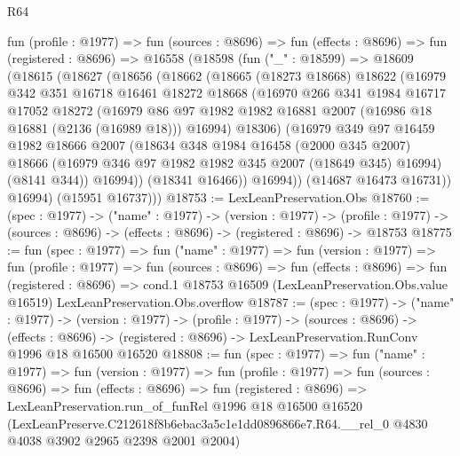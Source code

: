 \begin{lexlean}{R64}
\begin{coremodule}
  fun (profile : @1977) =>
  fun (sources : @8696) =>
  fun (effects : @8696) =>
  fun (registered : @8696) =>
  @16558
    (@18598
      (fun ("_" : @18599) =>
      @18609
        (@18615
          (@18627
            (@18656
              (@18662
                (@18665
                  (@18273 @18668)
                  @18622
                  (@16979
                    @342
                    @351
                    @16718
                    @16461
                    @18272
                    @18668
                    (@16970
                      @266
                      @341
                      @1984
                      @16717
                      @17052
                      @18272
                      (@16979
                        @86
                        @97
                        @1982
                        @1982
                        @16881
                        @2007
                        (@16986 @18 @16881 (@2136 (@16989 @18)))
                        @16994)
                      @18306)
                    (@16979
                      @349
                      @97
                      @16459
                      @1982
                      @18666
                      @2007
                      (@18634
                        @348
                        @1984
                        @16458
                        (@2000 @345 @2007)
                        @18666
                        (@16979 @346 @97 @1982 @1982 @345 @2007 (@18649 @345) @16994)
                        (@8141 @344))
                      @16994))
                  (@18341 @16466))
                @16994))
            (@14687 @16473 @16731))
          @16994)
        (@15951 @16737)))
@18753 := LexLeanPreservation.Obs
@18760 := (spec : @1977) ->
  ("name" : @1977) ->
  (version : @1977) ->
  (profile : @1977) -> (sources : @8696) -> (effects : @8696) -> (registered : @8696) -> @18753
@18775 := fun (spec : @1977) =>
  fun ("name" : @1977) =>
  fun (version : @1977) =>
  fun (profile : @1977) =>
  fun (sources : @8696) =>
  fun (effects : @8696) =>
  fun (registered : @8696) =>
  cond.{1} @18753 @16509 (LexLeanPreservation.Obs.value @16519) LexLeanPreservation.Obs.overflow
@18787 := (spec : @1977) ->
  ("name" : @1977) ->
  (version : @1977) ->
  (profile : @1977) ->
  (sources : @8696) ->
  (effects : @8696) -> (registered : @8696) -> LexLeanPreservation.RunConv @1996 @18 @16500 @16520
@18808 := fun (spec : @1977) =>
  fun ("name" : @1977) =>
  fun (version : @1977) =>
  fun (profile : @1977) =>
  fun (sources : @8696) =>
  fun (effects : @8696) =>
  fun (registered : @8696) =>
  LexLeanPreservation.run_of_funRel
    @1996
    @18
    @16500
    @16520
    (LexLeanPreserve.C212618f8b6ebac3a5c1e1dd0896866e7.R64.__rel_0
      @4830
      @4038
      @3902
      @2965
      @2398
      @2001
      @2004)
\end{coremodule}
\end{lexlean}
